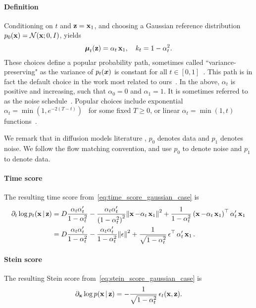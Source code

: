 \paragraph{Definition}
Conditioning on $t$ and $\operatorname{\mathbf{z}} = \operatorname{\mathbf{x}}_1$, and choosing a Gaussian reference distribution $p_0(\operatorname{\mathbf{x}}) = \mathcal{N}(\operatorname{\mathbf{x}}; 0, I)$, yields
\begin{align}
    \operatorname{\bm{\mu}}_t(\operatorname{\mathbf{z}}) = \alpha_t \operatorname{\mathbf{x}}_1,
    \quad
    k_t = 1 - \alpha_t^2.
\end{align}
These choices define a popular probability path, sometimes called ``variance-preserving" as the variance of $p_t({\bm{x}})$ is constant for all $t \in [0, 1]$~\citep{sohl-dickstein2015deep,ho2020ddpm,song2021sde,lipman2023conditionalflowmatching}. This path is in fact the default choice in the work most related to ours~\citep{choi2022densityratio}. In the above, $\alpha_t$ is positive and increasing, such that $\alpha_0 = 0$ and $\alpha_1 = 1$. It is sometimes referred to as the noise schedule~\citep{chen2023noisescheduling}. Popular choices include exponential $\alpha_t = \min(1, e^{-2(T-t)})$~\citep{song2021sde} for some fixed $T \geq 0$, or linear $\alpha_t = \min(1, t)$ functions~\citep{Albergo2023,gao2023gaussianinterpolant}.

We remark that in diffusion models literature \citep{song2021sde}, $p_{0}$ denotes data and $p_{1}$ denotes noise. We follow the flow matching convention, and use $p_{0}$ to denote noise and $p_{1}$ to denote data.


\paragraph{Time score}
The resulting time score from~\eqref{eq:time_score_gaussian_case} is
\begin{align}
    \partial_{t}\log p_{t}(\operatorname{\mathbf{x}}|\operatorname{\mathbf{z}})
    &= 
    D\frac{\alpha_{t}\alpha'_{t}}{1-\alpha_{t}^{2}} - 
    \frac{\alpha_{t}\alpha'_{t}}{\left(1-\alpha_{t}^{2}\right)^{2}}\norm{\operatorname{\mathbf{x}}-\alpha_{t}\operatorname{\mathbf{x}}_{1}}^{2}
    +
    \frac{1}{1-\alpha_{t}^{2}}\left(\operatorname{\mathbf{x}}-\alpha_{t}\operatorname{\mathbf{x}}_{1}\right)^{\top}\alpha'_{t}\operatorname{\mathbf{x}}_{1}\\
    &=D\frac{\alpha_{t}\alpha'_{t}}{1-\alpha_{t}^{2}} - \frac{\alpha_{t}\alpha'_{t}}{1-\alpha_{t}^{2}}\norm{\operatorname{\mathbf{\epsilon}}}^{2} + \frac{1}{\sqrt{1-\alpha_{t}^{2}}}\operatorname{\mathbf{\epsilon}}^{\top}\alpha'_{t}\operatorname{\mathbf{x}}_{1}.
\end{align}

\paragraph{Stein score}
The resulting Stein score from~\eqref{eq:stein_score_gaussian_case} is
\begin{align}
    \partial_{\operatorname{\mathbf{x}}}\log p(\operatorname{\mathbf{x}}|\operatorname{\mathbf{z}}) 
    =
    -\frac{1}{\sqrt{1-\alpha_{t}^{2}}}\operatorname{\mathbf{\epsilon}}_{t}(\operatorname{\mathbf{x}},\operatorname{\mathbf{z}}).
\end{align}


